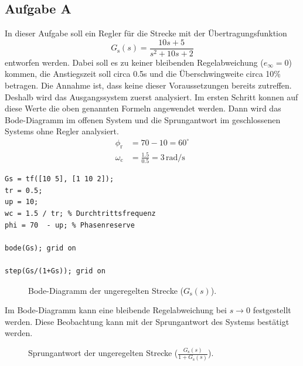 \documentclass[11pt,a4paper]{article}
\newlength\figureheight
\newlength\figurewidth
\begin{document}
\subsection{Aufgabe A}
In dieser Aufgabe soll ein Regler für die Strecke mit der Übertragungsfunktion $$G_{\mathrm{s}}(s) = \frac{10s + 5}{s^2 + 10s + 2}$$ entworfen werden. Dabei soll es zu keiner bleibenden Regelabweichung ($e_{\mathrm{\infty}} = 0$) kommen, die Anstiegszeit soll circa 0.5s und die Überschwingweite circa 10\% betragen. Die Annahme ist, dass keine dieser Voraussetzungen bereits zutreffen. Deshalb wird das Ausgangssystem zuerst analysiert.
Im ersten Schritt konnen auf diese Werte die oben genannten Formeln angewendet werden. Dann wird das Bode-Diagramm im offenen System und die Sprungantwort im geschlossenen Systems ohne Regler analysiert.
\begin{equation}
\begin{aligned}
    \phi_{\mathrm{r}} &= 70 - 10 = 60^{\circ} \\[1ex]
    \omega_{\mathrm{c}} &= \frac{1.5}{0.5} = 3\,\text{rad/s}
\end{aligned}
\label{eq:regler_design}
\end{equation}

\begin{lstlisting}
Gs = tf([10 5], [1 10 2]);
tr = 0.5;
up = 10;
wc = 1.5 / tr; % Durchtrittsfrequenz
phi = 70  - up; % Phasenreserve

bode(Gs); grid on 

step(Gs/(1+Gs)); grid on
\end{lstlisting}

\begin{figure}[H]
    \centering
    \setlength\figureheight{6cm}
    \setlength{} %
    
    
    
    \caption{Bode-Diagramm der ungeregelten Strecke ($G_{\mathrm{s}}(s)$).}
    \label{fig:matlab_plot1}
\end{figure}

\noindent Im Bode-Diagramm kann eine bleibende Regelabweichung bei $s \to 0$ festgestellt werden. Diese Beobachtung kann mit der Sprungantwort des Systems bestätigt werden.

\begin{figure}[H]
    \centering
    \setlength\figureheight{6cm}
    \setlength{} %
    
    
    
    \caption{Sprungantwort der ungeregelten Strecke ($\frac{G_{\mathrm{s}}(s)}{1 + G_{\mathrm{s}}(s)}$).}
    \label{fig:matlab_plot2}
\end{figure}
\end{document}
